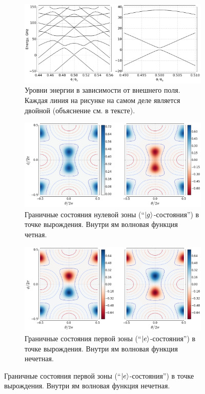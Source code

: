 \documentclass[12pt]{article}
\DeclarePairedDelimiter\ket{\lvert}{\rangle}
\numberwithin{equation}{section}
\begin{document}
\begin{figure}[!p]
\begingroup
\captionsetup[subfigure]{width=\textwidth}
\centering
\begin{subfigure}[t]{0.75\linewidth}
\centering
\includegraphics[width = \textwidth]{Pictures/qubit_levels}
\caption{Уровни энергии в зависимости от внешнего поля. Каждая линия на рисунке на самом деле является двойной (объяснение см. в тексте).}
\label{fig:levels}
\end{subfigure}

\begin{subfigure}[t]{0.8\linewidth}
\centering
\includegraphics[width = \textwidth]{Pictures/wfs01}
\caption{Граничные состояния нулевой зоны (``$\ket{g}$-состояния'') в точке вырождения. Внутри ям волновая функция четная.}
\label{fig:wfs01}
\end{subfigure}

\begin{subfigure}[t]{0.8\linewidth}
\centering
\includegraphics[width = \textwidth]{Pictures/wfs23}
\caption{Граничные состояния первой зоны (``$\ket{e}$-состояния'') в точке вырождения. Внутри ям волновая функция нечетная.}
\label{fig:wfs23}
\end{subfigure}


\end{figure}
\end{document}
